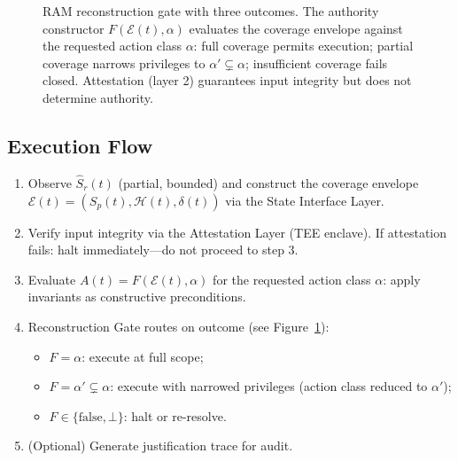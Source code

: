 \documentclass[11pt]{article}
\newcommand{\Sp}{S_p}
\newcommand{\Ndefval}{\bot}
\begin{document}
\begin{figure}[H]
\caption{RAM reconstruction gate with three outcomes.
The authority constructor $F(\mathcal{E}(t),\alpha)$ evaluates the coverage
envelope against the requested action class $\alpha$:
full coverage permits execution; partial coverage narrows privileges to
$\alpha' \subsetneq \alpha$; insufficient coverage fails closed.
Attestation (layer 2) guarantees input integrity but does not determine authority.}
\label{fig:arch}
\end{figure}

\subsection{Execution Flow}

\begin{enumerate}[leftmargin=*, label=(\arabic*)]
  \item Observe $\hat{S}_r(t)$ (partial, bounded) and construct the coverage
        envelope $\mathcal{E}(t) = (\Sp(t), \mathcal{H}(t), \delta(t))$
        via the State Interface Layer.
  \item Verify input integrity via the Attestation Layer (TEE enclave).
        If attestation fails: halt immediately---do not proceed to step 3.
  \item Evaluate $A(t) = F(\mathcal{E}(t), \alpha)$ for the requested
        action class $\alpha$: apply invariants as constructive preconditions.
  \item Reconstruction Gate routes on outcome (see Figure~\ref{fig:arch}):
        \begin{itemize}
          \item $F = \alpha$: execute at full scope;
          \item $F = \alpha' \subsetneq \alpha$: execute with narrowed
                privileges (action class reduced to $\alpha'$);
          \item $F \in \{\text{false}, \Ndefval\}$: halt or re-resolve.
        \end{itemize}
  \item (Optional) Generate justification trace for audit.
\end{enumerate}
\end{document}
